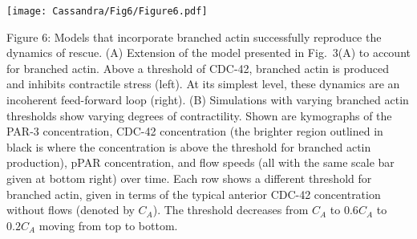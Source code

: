 \documentclass[11pt]{article}
\newcommand{\6}[1]{#1_{\text{6}}}
\newcommand{\3}[1]{#1_{\text{3}}}
\begin{document}
\newpage 
\begin{center}
\texttt{[image: Cassandra/Fig6/Figure6.pdf]}
\end{center}

\newpage
Figure 6: Models that incorporate branched actin successfully reproduce the dynamics of rescue. (A) Extension of the model presented in Fig.\ 3(A) to account for branched actin. Above a threshold of CDC-42, branched actin is produced and inhibits contractile stress (left). At its simplest level, these dynamics are an incoherent feed-forward loop (right). (B) Simulations with varying branched actin thresholds show varying degrees of contractility. Shown are kymographs of the PAR-3 concentration, CDC-42 concentration (the brighter region outlined in black is where the concentration is above the threshold for branched actin production), pPAR concentration, and flow speeds (all with the same scale bar given at bottom right) over time. Each row shows a different threshold for branched actin, given in terms of the typical anterior CDC-42 concentration without flows (denoted by $C_A$). The threshold decreases from $C_A$ to $0.6C_A$ to $0.2C_A$ moving from top to bottom.




\end{document}
